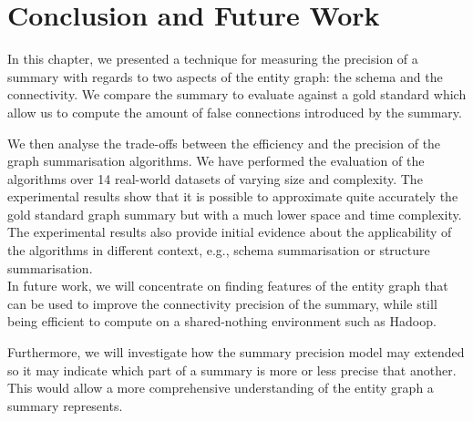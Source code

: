 \section{Conclusion and Future Work}

In this chapter, we presented a technique for measuring the precision of a summary with regards to two aspects of the entity graph: the \gls{schema} and the \gls{connectivity}. We compare the summary to evaluate against a gold standard which allow us to compute the amount of false connections introduced by the summary.

We then analyse the trade-offs between the efficiency and the precision of the graph summarisation algorithms. We have performed the evaluation of the algorithms over 14 real-world datasets of varying size and complexity. The experimental results show that it is possible to approximate quite accurately the gold standard graph summary but with a much lower space and time complexity. The experimental results also provide initial evidence about the applicability of the algorithms in different context, e.g., schema summarisation or structure summarisation.\\

In future work, we will concentrate on finding features of the entity graph that can be used to improve the \gls{connectivity} precision of the summary, while still being efficient to compute on a shared-nothing environment such as Hadoop.

Furthermore, we will investigate how the summary precision model may extended so it may indicate which part of a summary is more or less precise that another. This would allow a more comprehensive understanding of the entity graph a summary represents.
